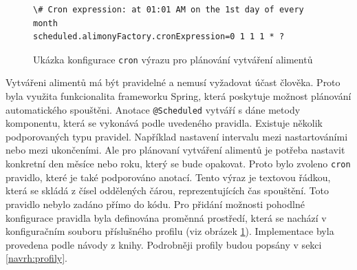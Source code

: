             \begin{figure}
                \begin{verbatim}
\# Cron expression: at 01:01 AM on the 1st day of every month
scheduled.alimonyFactory.cronExpression=0 1 1 1 * ?
                \end{verbatim}
                \caption{Ukázka konfigurace \texttt{cron} výrazu pro plánování vytváření alimentů} 
                \label{code:cron-expression}
            \end{figure}
            Vytvářeni alimentů má být pravidelné a nemusí vyžadovat účast člověka. Proto byla využita funkcionalita frameworku Spring, která poskytuje možnost plánování automatického spouštěni.\cite{spring-scheduling} Anotace \verb|@Scheduled| vytváří s dáne metody komponentu, která se vykonává podle uvedeného pravidla. Existuje několik podporovaných typu pravidel. 
            Například nastavení intervalu mezi nastartováními nebo mezi ukončeními. Ale pro plánovaní vytváření alimentů je potřeba nastavit konkretní den měsíce nebo roku, který se bude opakovat. Proto bylo zvoleno \verb|cron| pravidlo, které je také podporováno anotací.\cite{cron-expression} Tento výraz je textovou řádkou, která se skládá z čísel oddělených čárou, reprezentujících čas spouštění.
            Toto pravidlo nebylo zadáno přímo do kódu. Pro přidání možnosti pohodlné konfigurace pravidla byla definována proměnná prostředí, která se nachází v konfiguračním souboru příslušného profilu (viz obrázek \ref{code:cron-expression}). Implementace byla provedena podle návody z knihy\cite{sbr:spring-task-scheduling}. Podrobněji profily budou popsány v sekci \ref{navrh:profily}.
         
